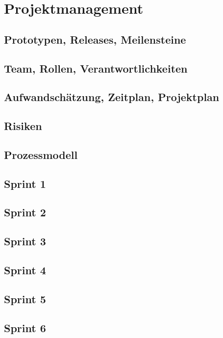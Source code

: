 \chapter{Projektmanagement}
\label{pm-projektmanagement}

\section{Prototypen, Releases, Meilensteine}


\section{Team, Rollen, Verantwortlichkeiten}


\section{Aufwandschätzung, Zeitplan, Projektplan}


\section{Risiken}


\section{Prozessmodell}


\section{Sprint 1}


\section{Sprint 2}


\section{Sprint 3}


\section{Sprint 4}


\section{Sprint 5}


\section{Sprint 6}